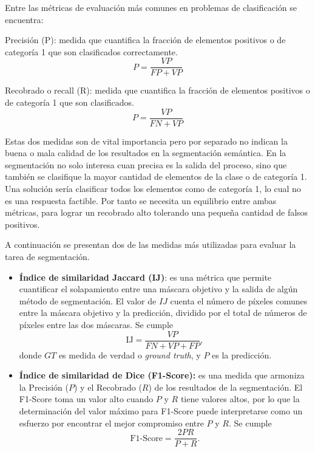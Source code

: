 Entre las métricas de evaluación más comunes en problemas de clasificación se encuentra:

\begin{definition}
	Precisión (P): medida que cuantifica la fracción de elementos positivos o de categoría 1 que son clasificados correctamente. 
	$$ P = \frac{VP}{FP + VP}$$	
\end{definition}

\begin{definition}
	Recobrado o recall (R): medida que cuantifica la fracción de elementos positivos o de categoría 1 que son clasificados.
	$$ P = \frac{VP}{FN + VP}$$	
\end{definition}

Estas dos medidas son de vital importancia pero por separado no indican la buena o mala calidad de los resultados en la segmentación semántica. En la segmentación no solo interesa cuan precisa es la salida del proceso, sino que también se clasifique la mayor cantidad de elementos de la clase o de categoría 1. Una solución sería clasificar todos los elementos como de categoría 1, lo cual no es una respuesta factible. Por tanto se necesita un equilibrio entre ambas métricas, para lograr un recobrado alto tolerando una pequeña cantidad de falsos positivos.

A continuación se presentan dos de las medidas más utilizadas para evaluar la tarea de segmentación.

\begin{itemize}
	\item \textbf{Índice de similaridad Jaccard (IJ)}: es una métrica que permite cuantificar el solapamiento entre una máscara objetivo y la salida de algún método de segmentación. El valor de $IJ$ cuenta el número de píxeles comunes entre la máscara objetivo y la predicción, dividido por el total de números de píxeles entre las dos máscaras. Se cumple
	\begin{equation}
		\text{IJ} = \frac{VP}{FN + VP + FP},
	\end{equation}
donde $GT$ es medida de verdad o \textit{ground truth}, y $P$ es la predicción.
	
	\item \textbf{Índice de similaridad de Dice (F1-Score):} es una medida que armoniza la Precisión ($P$) y el Recobrado ($R$) de los resultados de la segmentación. El F1-Score toma un valor alto cuando $P$ y $R$ tiene valores altos, por lo que la determinación del valor máximo para F1-Score puede interpretarse como un esfuerzo por encontrar el mejor compromiso entre $P$ y $R$. Se cumple
	\begin{equation}
		\text{F1-Score} = \frac{2PR}{P + R}.
	\end{equation}
\end{itemize}

